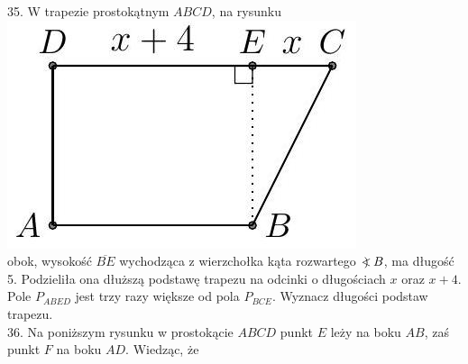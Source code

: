 \documentclass[10pt]{article}
\newcommand\Varangle{\mathop{{<\!\!\!\!\!\text{\small)}}\:}\nolimits}
\begin{document}
35. W trapezie prostokątnym \(A B C D\), na rysunku\\
\includegraphics[max width=\textwidth, center]{2024_11_21_71f62bd117d375398909g-038}\\
obok, wysokość \(\overline{B E}\) wychodząca z wierzchołka kąta rozwartego \(\Varangle B\), ma długość 5. Podzieliła ona dłuższą podstawę trapezu na odcinki o długościach \(x\) oraz \(x+4\). Pole \(P_{A B E D}\) jest trzy razy większe od pola \(P_{B C E}\). Wyznacz długości podstaw trapezu.\\
36. Na poniższym rysunku w prostokącie \(A B C D\) punkt \(E\) leży na boku \(A B\), zaś punkt \(F\) na boku \(A D\). Wiedząc, że\\
\end{document}
